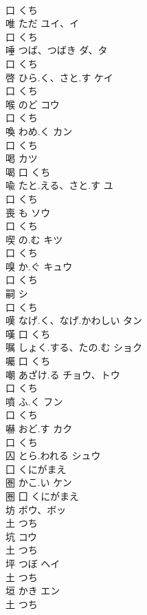 \documentclass[8pt]{extreport}
\begin{document}
\begin{CJK}{UTF8}{min}
\\	口		くち		
\\	唯	ただ	ユイ、イ	
\\	口		くち		
\\	唾	つば、つばき	ダ、タ	
\\	口		くち		
\\	啓	ひら.く、さと.す	ケイ	
\\	口		くち		
\\	喉	のど	コウ	
\\	口		くち		
\\	喚	わめ.く	カン	
\\	口		くち		
\\	喝		カツ	
\\	喝	口		くち		
\\	喩	たと.える、さと.す	ユ	
\\	口		くち		
\\	喪	も	ソウ	
\\	口		くち		
\\	喫	の.む	キツ	
\\	口		くち		
\\	嗅	か.ぐ	キュウ	
\\	口		くち		
\\	嗣		シ	
\\	口		くち		
\\	嘆	なげ.く、なげ.かわしい	タン	
\\	嘆	口		くち		
\\	嘱	しょく.する、たの.む	ショク	
\\	囑	口		くち		
\\	嘲	あざけ.る	チョウ、トウ	
\\	口		くち		
\\	噴	ふ.く	フン	
\\	口		くち		
\\	嚇	おど.す	カク	
\\	口		くち		
\\	囚	とら.われる	シュウ	
\\	囗		くにがまえ		
\\	圏	かこ.い	ケン	
\\	圈	囗		くにがまえ		
\\	坊		ボウ、ボッ	
\\	土		つち		
\\	坑		コウ	
\\	土		つち		
\\	坪	つぼ	ヘイ	
\\	土		つち		
\\	垣	かき	エン	
\\	土		つち		

\end{CJK}
\end{document}

